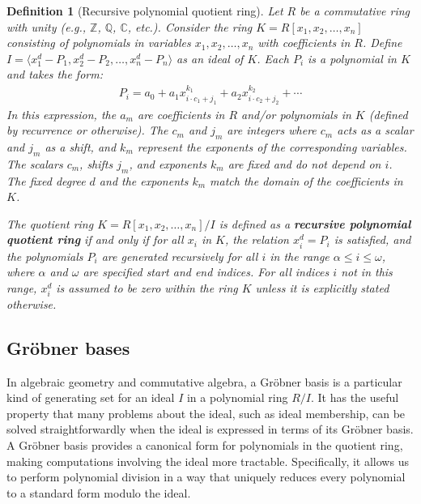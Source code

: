 \documentclass[12pt,reqno]{article}
\theoremstyle{plain}
\newtheorem{definition}[theorem]{Definition}
\newcommand{\Z}{\mathbb{Z}}
\begin{document}
\begin{definition}[Recursive polynomial quotient ring] \label{definition:recursivering}
Let $R$ be a commutative ring with unity (e.g., $\Z$, $\mathbb{Q}$, $\mathbb{C}$, etc.). Consider the ring $K = R[x_1, x_2, \ldots, x_{n} ]$ consisting of polynomials in variables $x_1, x_2, \ldots, x_n$ with coefficients in $R$. Define $I = \langle x_1^d - P_1, x_2^d - P_2, \ldots, x_n^d - P_n \rangle$ as an ideal of $K$. Each $P_i$ is a polynomial in $K$ and takes the form:
\begin{align*}
    P_i = a_0 + a_1 x_{i \cdot c_1 + j_1}^{k_1} + a_2 x_{i \cdot c_2 + j_2}^{k_2} + \cdots
\end{align*}
In this expression, the $a_m$ are coefficients in $R$ and/or polynomials in $K$ (defined by recurrence or otherwise). The $c_m$ and $j_m$ are integers where $c_m$ acts as a scalar and $j_m$ as a shift, and $k_m$ represent the exponents of the corresponding variables. The scalars $c_m$, shifts $j_m$, and exponents $k_m$ are fixed and do not depend on $i$. The fixed degree $d$ and the exponents $k_m$ match the domain of the coefficients in $K$.

The quotient ring $K = R[x_1, x_2, \ldots, x_{n}]/I$ is defined as a \textbf{recursive polynomial quotient ring} if and only if for all $x_i$ in $K$, the relation $x_i^d = P_i$ is satisfied, and the polynomials $P_i$ are generated recursively for all $i$ in the range $\alpha \leq i \leq \omega$, where $\alpha$ and $\omega$ are specified start and end indices. For all indices $i$ not in this range, $x_i^d$ is assumed to be zero within the ring $K$ unless it is explicitly stated otherwise.
\end{definition}

\subsection{Gröbner bases}
In algebraic geometry and commutative algebra, a Gröbner basis \cite{dube1990grobner} is a particular kind of generating set for an ideal $I$ in a polynomial ring $R/I$. It has the useful property that many problems about the ideal, such as ideal membership, can be solved straightforwardly when the ideal is expressed in terms of its Gröbner basis. A Gröbner basis provides a canonical form for polynomials in the quotient ring, making computations involving the ideal more tractable. Specifically, it allows us to perform polynomial division in a way that uniquely reduces every polynomial to a standard form modulo the ideal.
\end{document}
